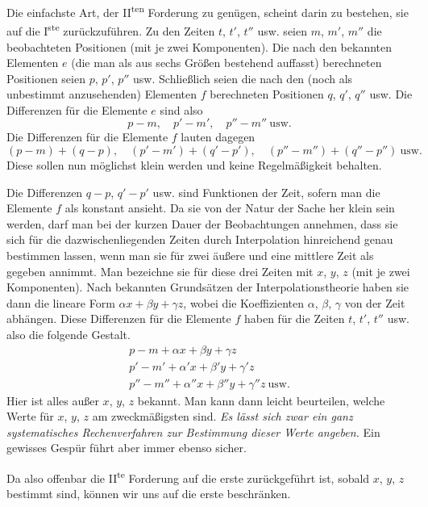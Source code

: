 %
Die einfachste Art, der II\textsuperscript{ten} Forderung zu genügen, scheint darin zu bestehen, sie auf die I\textsuperscript{ste} zurückzuführen. Zu den Zeiten $t$, $t'$, $t''$ usw. seien $m$, $m'$, $m''$ die beobachteten Positionen (mit je zwei Komponenten). Die nach den bekannten Elementen $e$ (die man als aus sechs Größen bestehend auffasst) berechneten Positionen seien $p$, $p'$, $p''$ usw. Schließlich seien die nach den (noch als unbestimmt anzusehenden) Elementen $f$ berechneten Positionen $q$, $q'$, $q''$ usw. Die Differenzen für die Elemente $e$ sind also
\[
p-m,\quad p'-m',\quad p''-m''\ \text{usw.}
\]
Die Differenzen für die Elemente $f$ lauten dagegen
\[
(p-m)+(q-p),\quad(p'-m')+(q'-p'),\quad(p''-m'')+(q''-p'')\ \text{usw.}
\]
Diese sollen nun möglichst klein werden und keine Regelmäßigkeit behalten.

Die Differenzen $q-p$, $q'-p'$ usw. sind Funktionen der Zeit, sofern man die Elemente $f$ als konstant ansieht. Da sie von der Natur der Sache her klein sein werden, darf man bei der kurzen Dauer der Beobachtungen annehmen, dass sie sich für die dazwischenliegenden Zeiten durch Interpolation hinreichend genau bestimmen lassen, wenn man sie für zwei äußere und eine mittlere Zeit als gegeben annimmt. Man bezeichne sie für diese drei Zeiten mit $x$, $y$, $z$ (mit je zwei Komponenten). Nach bekannten Grundsätzen der Interpolationstheorie haben sie dann die lineare Form $\alpha x+\beta y+\gamma z$, wobei die Koeffizienten $\alpha$, $\beta$, $\gamma$ von der Zeit abhängen. Diese Differenzen für die Elemente $f$ haben für die Zeiten $t$, $t'$, $t''$ usw. also die folgende Gestalt.
\[
\begin{gathered}
p-m+\alpha x+\beta y+\gamma z\\
p'-m'+\alpha'x+\beta'y+\gamma'z\\
p''-m''+\alpha''x+\beta''y+\gamma''z\ \text{usw.}
\end{gathered}
\]
Hier ist alles außer $x$, $y$, $z$ bekannt. Man kann dann leicht beurteilen, welche Werte für $x$, $y$, $z$ am zweckmäßigsten sind. \emph{Es lässt sich zwar ein ganz systematisches Rechenverfahren zur Bestimmung dieser Werte angeben.} Ein gewisses Gespür führt aber immer ebenso sicher.

Da also offenbar die II\textsuperscript{te} Forderung auf die erste zurückgeführt ist, sobald $x$, $y$, $z$ bestimmt sind, können wir uns auf die erste beschränken.

